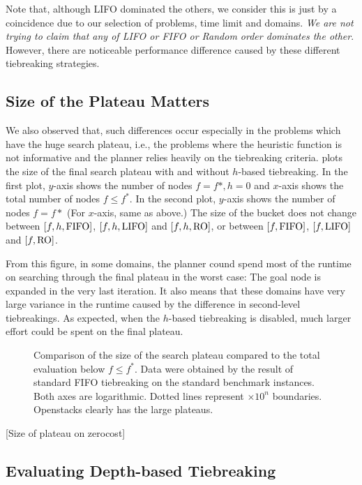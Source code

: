 Note that, although LIFO dominated the others, we consider this is just
by a coincidence due to our selection of problems, time limit and
domains. \emph{We are not trying to claim that any of LIFO or FIFO or
Random order dominates the other}. However, there are noticeable
performance difference caused by these different tiebreaking strategies.

\subsection{Size of the Plateau Matters}

We also observed that, such differences occur especially in the problems which
have the huge search plateau, i.e., the problems where the heuristic
function is not informative and the planner relies heavily on the
tiebreaking criteria.
% 
 plots the size of the final search plateau with and
without $h$-based tiebreaking. In the first plot, $y$-axis shows the
number of nodes $f=f*, h=0$ and $x$-axis shows the total number of nodes
$f\leq f^*$.  In the second plot, $y$-axis shows the number of nodes
$f=f*$ (For $x$-axis, same as above.)  The size of the bucket does not
change between $[f,h,\mbox{FIFO}]$, $[f,h,\mbox{LIFO}]$ and $[f,h,\mbox{RO}]$, or between
$[f,\mbox{FIFO}]$, $[f,\mbox{LIFO}]$ and $[f,\mbox{RO}]$.

From this figure, in some domains, the planner cound spend most of the
runtime on searching through the final plateau in the worst case: The
goal node is expanded in the very last iteration. It also means that
these domains have very large variance in the runtime caused by the
difference in second-level tiebreakings.  As expected, when the
$h$-based tiebreaking is disabled, much larger effort could be spent on
the final plateau.

\begin{figure}[htb]
 \centering {}
 
 \caption{Comparison of the size of the search plateau compared to the
 total evaluation below $f\leq f^*$. Data were obtained by the result of standard FIFO
 tiebreaking on the standard benchmark instances. Both axes are
 logarithmic. Dotted lines represent $\times 10^n$ boundaries.
 Openstacks clearly has the large plateaus.}  \label{plateau}
\end{figure}

[Size of plateau on zerocost]

\subsection{Evaluating Depth-based Tiebreaking}

